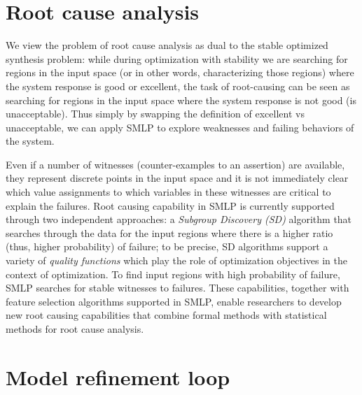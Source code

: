 \documentclass[a4paper,parskip=half]{article} %
\newcommand{\delete}[1]{}
\begin{document}
\section{Root cause analysis}\label{sec:rca}

We view the problem of root cause analysis as dual to the stable optimized synthesis problem: while during optimization with 
stability we are searching for regions in the input space (or in other words, characterizing those regions) where the system response 
is good or excellent, the task of root-causing can be seen as searching for regions in the input space where the system response is 
not good (is unacceptable). Thus simply by swapping the definition of excellent vs unacceptable, we can apply SMLP to explore 
weaknesses and failing behaviors of the system.

Even if a number of witnesses (counter-examples to an assertion) are available, they represent discrete points in the input space 
and it is not immediately clear which value assignments to which variables in these witnesses are critical to explain the failures. 
Root causing capability in SMLP is currently supported through two independent approaches:
a \emph{Subgroup Discovery (SD)} algorithm that searches through the data for the input regions where there is a higher ratio 
(thus, higher probability) of failure; to be precise, SD algorithms support a variety of \emph{quality functions} which play the role of 
optimization objectives in the context of optimization.
To find input regions with high probability of failure, SMLP searches for stable witnesses to failures. These capabilities, together with 
feature selection algorithms supported in SMLP, enable researchers to develop new root causing capabilities that combine formal 
methods with statistical methods for root cause analysis. 


\section{Model refinement loop}\label{sec:refinement}
\end{document}
